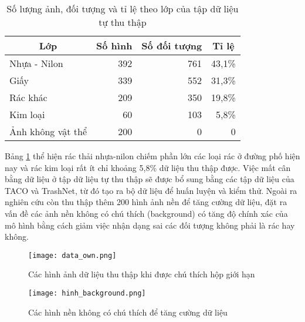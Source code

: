 \documentclass[../the.tex]{subfiles}
\begin{document}
\begin{table}[!ht]
	\centering
	\caption{Số lượng ảnh, đối tượng và tỉ lệ theo lớp của tập dữ liệu tự thu thập}
	\begin{tabular}{|l|r|r|r|}
		\hline
		\multicolumn{1}{|c|}{\textbf{Lớp}}
		                  & \multicolumn{1}{c|}{\textbf{Số hình}}
		                  & \multicolumn{1}{c|}{\textbf{Số đối tượng}}
		                  & \multicolumn{1}{c|}{\textbf{Tỉ lệ}}
		\\
		\hline

		Nhựa - Nilon      & 392                                        & 761 & 43,1\% \\
		\hline

		Giấy              & 339                                        & 552 & 31,3\% \\
		\hline

		Rác khác          & 209                                        & 350 & 19,8\% \\
		\hline

		Kim loại          & 60                                         & 103 & 5,8\%  \\
		\hline
		Ảnh không vật thể & 200                                        & 0   & 0      \\
		\hline
	\end{tabular}

	\label{tab:datasetown}
\end{table}

{\fontsize{13}{12} \selectfont

Bảng \ref{tab:datasetown} thể hiện rác thải nhựa-nilon chiếm phần lớn các loại rác ở đường phố hiện nay và rác kim loại rất ít chỉ khoảng 5,8\% dữ liệu thu thập được.
Việc mất cân bằng dữ liệu ở tập dữ liệu tự thu thập sẽ được bổ sung bằng các tập dữ liệu của TACO và TrashNet, từ đó tạo ra bộ dữ liệu để huấn luyện và kiểm thử.
Ngoài ra nghiên cứu còn thu thập thêm 200 hình ảnh nền để tăng cường dữ liệu, đặt ra vấn đề các ảnh nền không có chú thích (background) có tăng độ chính xác của mô hình bằng cách giảm việc nhận dạng sai các đối tượng không phải là rác hay không.

}


\begin{figure}[H]
	\centering
	\texttt{[image: data\_own.png]}
	\caption{Các hình ảnh dữ liệu thu thập khi được chú thích hộp giới hạn}
	\label{fig:dataset_own}
\end{figure}

\begin{figure}[H]
	\centering
	\texttt{[image: hinh\_background.png]}
	\caption{Các hình nền không có chú thích để tăng cường dữ liệu}
	\label{fig:dataset_bg}
\end{figure}
\end{document}
